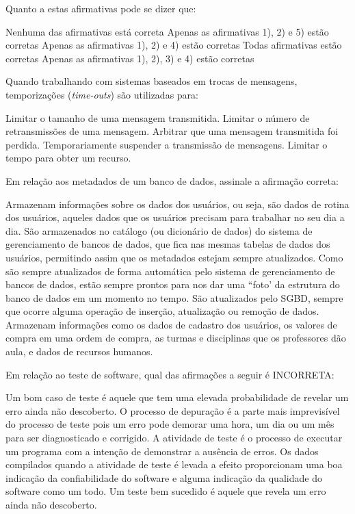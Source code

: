 \documentclass[12pt, addpoints]{exam}
\begin{document}
\begin{questions}
Quanto a estas afirmativas pode se dizer que:
\begin{choices}
\choice Nenhuma das afirmativas está correta
\choice Apenas as afirmativas 1), 2) e 5) estão corretas
\choice Apenas as afirmativas 1), 2) e 4) estão corretas
\choice Todas afirmativas estão corretas
\choice Apenas as afirmativas 1), 2), 3) e 4) estão corretas
\end{choices}

\question
Quando trabalhando com sistemas baseados em trocas de mensagens, temporizações (\textit{time-outs}) são utilizadas para:

\begin{choices}
\choice Limitar o tamanho de uma mensagem transmitida.
\choice Limitar o número de retransmissões de uma mensagem.
\choice Arbitrar que uma mensagem transmitida foi perdida.
\choice Temporariamente suspender a transmissão de mensagens.
\choice Limitar o tempo para obter um recurso.
\end{choices}

\question
Em relação aos metadados de um banco de dados, assinale a afirmação correta:
\begin{choices}
\choice Armazenam informações sobre os dados dos usuários, ou seja, são dados de rotina dos usuários, aqueles dados que os usuários precisam para trabalhar no seu dia a dia.
\choice São armazenados no catálogo (ou dicionário de dados) do sistema de gerenciamento de bancos de dados, que fica nas mesmas tabelas de dados dos usuários, permitindo assim que os metadados estejam sempre atualizados.
\choice Como são sempre atualizados de forma automática pelo sistema de gerenciamento de bancos de dados, estão sempre prontos para nos dar uma ``foto' da estrutura do banco de dados em um momento no tempo.
\choice São atualizados pelo SGBD, sempre que ocorre alguma operação de inserção, atualização ou remoção de dados.
\choice Armazenam informações como os dados de cadastro dos usuários, os valores de compra em uma ordem de compra, as turmas e disciplinas que os professores dão aula, e dados de recursos humanos.
\end{choices}

\question
Em relação ao teste de software, qual das afirmações a seguir é INCORRETA: 
\begin{choices}
\choice Um bom caso de teste é aquele que tem uma elevada probabilidade de revelar um erro ainda não descoberto. 
\choice O processo de depuração é a parte mais imprevisível do processo de teste pois um erro pode demorar uma hora, um dia ou um mês para ser diagnosticado e corrigido. 
\choice A atividade de teste é o processo de executar um programa com a intenção de demonstrar a ausência de erros. 
\choice Os dados compilados quando a atividade de teste é levada a efeito proporcionam uma boa indicação da confiabilidade do software e alguma indicação da qualidade do software como um todo. 
\choice Um teste bem sucedido é aquele que revela um erro ainda não descoberto. 
\end{choices}


\end{questions}
\end{document}
